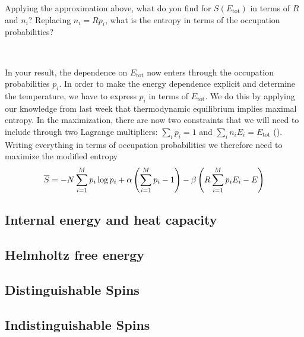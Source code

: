 \newpage %
Applying the approximation above, what do you find for $S(E_{\text{tot}})$ in terms of $R$ and $n_i$?
Replacing $n_i = R p_i$, what is the entropy in terms of the occupation probabilities?
\begin{mdframed}
  \ \\[100 pt]
\end{mdframed}

In your result, the dependence on $E_{\text{tot}}$ now enters through the occupation probabilities $p_i$.
In order to make the energy dependence explicit and determine the temperature, we have to express $p_i$ in terms of $E_{\text{tot}}$.
We do this by applying our knowledge from last week that thermodynamic equilibrium implies maximal entropy.
In the maximization, there are now two constraints that we will need to include through two Lagrange multipliers: $\sum_i p_i = 1$ and $\sum_i n_i E_i = E_{\text{tot}}$ ().
Writing everything in terms of occupation probabilities we therefore need to maximize the modified entropy
\begin{equation*}
  \overline S = -N \sum_{i = 1}^M p_i \log p_i + \alpha\left(\sum_{i = 1}^M p_i - 1\right) - \beta\left(R \sum_{i = 1}^M p_i E_i - E\right)
\end{equation*}




\newpage %
\subsection{Internal energy and heat capacity}



\newpage %
\subsection{Helmholtz free energy}



\newpage %
\subsection{Distinguishable Spins}



\newpage %
\subsection{Indistinguishable Spins}
